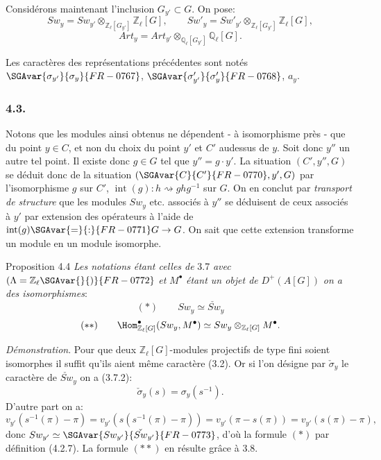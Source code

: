 Considérons maintenant l'inclusion $G_{y'}\subset G$. On pose:
\[
Sw_y=Sw_{y'}\otimes_{\mathbb{Z}_\ell[G_{y'}]}\mathbb{Z}_\ell[G],
\qquad
Sw'_y=Sw'_{y'}\otimes_{\mathbb{Z}_\ell[G_{y'}]}\mathbb{Z}_\ell[G],
\tag{4.2.7}
\]
\[
Art_y=Art_{y'}\otimes_{\mathbb{Q}_\ell[G_{y'}]}\mathbb{Q}_\ell[G].
\tag{4.2.8}
\]

Les caractères des représentations précédentes sont notés $\SGAvar{\sigma_{y'}}{\sigma_y}{FR-0767}$, $\SGAvar{\sigma'_{y'}}{\sigma'_y}{FR-0768}$, $a_y$.

\subsubsection*{4.3.}

Notons que les modules ainsi obtenus ne dépendent - à isomorphisme près - que du point $y\in C$, et non du choix du point $y'$ et $C'$ audessus de $y$. Soit donc $y''$ un autre tel point. Il existe donc $g\in G$ tel que $y''=g\cdot y'$. La situation $(C',y'',G)$ se déduit donc de la situation $(\SGAvar{C}{C'}{FR-0770},y',G)$ par l'isomorphisme $g$ sur $C'$, $\operatorname{int}(g):h\rightsquigarrow ghg^{-1}$ sur $G$. On en conclut par \emph{transport de structure} que les modules $Sw_y$ etc. associés à $y''$ se déduisent de ceux associés à $y'$ par extension des opérateurs à l'aide de $\operatorname{int}(g)\SGAvar{=}{:}{FR-0771}G\to G$. On sait que cette extension transforme un module en un module isomorphe.

\begin{statement}{Proposition 4.4}
\emph{Les notations étant celles de} 3.7 \emph{avec} $(\Lambda=\mathbb{Z}_\ell\SGAvar{}{)}{FR-0772}$ \emph{et} $M^\bullet$ \emph{étant un objet de} $D^+(A[G])$ \emph{on a des isomorphismes}:
\[
(*)\qquad Sw_y\simeq \check{Sw}_y
\]
\[
(**)\qquad
\Hom^\bullet_{\mathbb{Z}_\ell[G]}(Sw_y,M^\bullet)
\simeq Sw_y\otimes_{\mathbb{Z}_\ell[G]}M^\bullet.
\]
\end{statement}

\emph{Démonstration}. Pour que deux $\mathbb{Z}_\ell[G]$-modules projectifs de type fini soient isomorphes il suffit qu'ils aient même caractère (3.2). Or si l'on désigne par $\check\sigma_y$ le caractère de $\check{Sw}_y$ on a (3.7.2):
\[
\check\sigma_y(s)=\sigma_y(s^{-1}).
\]
D'autre part on a:
\[
v_{y'}(s^{-1}(\pi)-\pi)
=v_{y'}(s(s^{-1}(\pi)-\pi))
=v_{y'}(\pi-s(\pi))
=v_{y'}(s(\pi)-\pi),
\]
donc $Sw_{y'}\simeq\SGAvar{ Sw_{y'}}{\check{Sw}_{y'}}{FR-0773}$, d'où la formule $(*)$ par définition (4.2.7). La formule $(**)$ en résulte grâce à 3.8.

